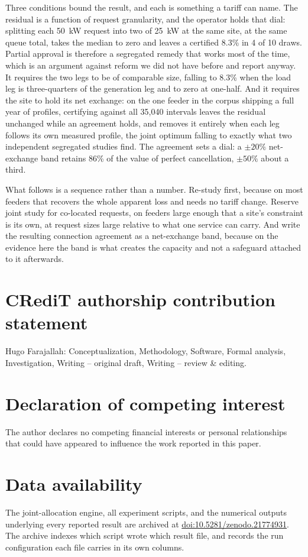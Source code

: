 \documentclass[review,authoryear,12pt]{elsarticle}
\begin{document}
Three conditions bound the result, and each is something a tariff can name.
The residual is a function of request granularity, and the operator holds that
dial: splitting each 50~kW request into two of 25~kW at the same site, at the
same queue total, takes the median to zero and leaves a certified 8.3\% in 4 of
10 draws. Partial approval is therefore a segregated remedy that works most of
the time, which is an argument against reform we did not have before and report
anyway. It requires the two legs to be of comparable size, falling to
8.3\% when the load leg is three-quarters of the generation leg and to zero at
one-half. And it requires the site to hold its net exchange: on the one feeder
in the corpus shipping a full year of profiles, certifying against all 35{,}040
intervals leaves the residual unchanged while an agreement holds, and removes
it entirely when each leg follows its own measured profile, the joint
optimum falling to exactly what two independent segregated studies find. The
agreement sets a dial: a $\pm20\%$ net-exchange band retains 86\% of the value
of perfect cancellation, $\pm50\%$ about a third.

What follows is a sequence rather than a number. Re-study first, because on
most feeders that recovers the whole apparent loss and needs no tariff change.
Reserve joint study for co-located requests, on feeders large enough that a
site's constraint is its own, at request sizes large relative to what one
service can carry. And write the resulting connection agreement as a
net-exchange band, because on the evidence here the band is what creates the
capacity and not a safeguard attached to it afterwards.

\section*{CRediT authorship contribution statement}
Hugo Farajallah: Conceptualization, Methodology, Software, Formal analysis,
Investigation, Writing -- original draft, Writing -- review \& editing.

\section*{Declaration of competing interest}
The author declares no competing financial interests or personal
relationships that could have appeared to influence the work reported in
this paper.

\section*{Data availability}
The joint-allocation engine, all experiment scripts, and the numerical outputs
underlying every reported result are archived at
\href{https://doi.org/10.5281/zenodo.21774931}{doi:10.5281/zenodo.21774931}.
The archive indexes which script wrote which result file, and records the run
configuration each file carries in its own columns.
\end{document}
